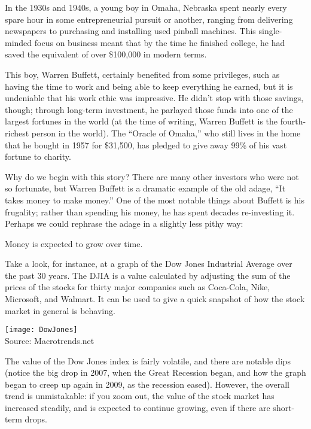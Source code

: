 \setcounter{ExampleCounter}{1}
In the 1930s and 1940s, a young boy in Omaha, Nebraska spent nearly every spare hour in some entrepreneurial pursuit or another, ranging from delivering newspapers to purchasing and installing used pinball machines.  This single-minded focus on business meant that by the time he finished college, he had saved the equivalent of over \$100,000 in modern terms.

This boy, Warren Buffett, certainly benefited from some privileges, such as having the time to work and being able to keep everything he earned, but it is undeniable that his work ethic was impressive.  He didn't stop with those savings, though; through long-term investment, he parlayed those funds into one of the largest fortunes in the world (at the time of writing, Warren Buffett is the fourth-richest person in the world).  The ``Oracle of Omaha,'' who still lives in the home that he bought in 1957 for \$31,500, has pledged to give away 99\% of his vast fortune to charity.

Why do we begin with this story?  There are many other investors who were not so fortunate, but Warren Buffett is a dramatic example of the old adage, ``It takes money to make money.''  One of the most notable things about Buffett is his frugality; rather than spending his money, he has spent decades re-investing it.  Perhaps we could rephrase the adage in a slightly less pithy way:
\begin{center}
Money is expected to grow over time.
\end{center}

Take a look, for instance, at a graph of the Dow Jones Industrial Average over the past 30 years.  The DJIA is a value calculated by adjusting the sum of the prices of the stocks for thirty major companies such as Coca-Cola, Nike, Microsoft, and Walmart.  It can be used to give a quick snapshot of how the stock market in general is behaving.
\begin{center}
\texttt{[image: DowJones]}\\
\text{} \hfill {\color{gray} Source: Macrotrends.net}
\end{center}

The value of the Dow Jones index is fairly volatile, and there are notable dips (notice the big drop in 2007, when the Great Recession began, and how the graph began to creep up again in 2009, as the recession eased).  However, the overall trend is unmistakable: if you zoom out, the value of the stock market has increased steadily, and is expected to continue growing, even if there are short-term drops.

